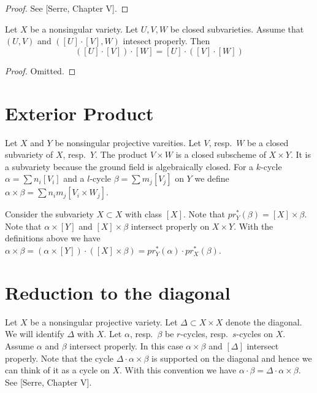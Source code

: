 \begin{proof}
See [Serre, Chapter V].
\end{proof}


\begin{lemma}
\label{lemma-associativity}
Let $X$ be a nonsingular variety.
Let $U, V, W$ be closed subvarieties. Assume that
$(U, V)$ and $([U] \cdot [V], W)$ intesect properly.
Then
$$
([U] \cdot [V]) \cdot [W] = [U] \cdot ( [V] \cdot [W] )
$$
\end{lemma}

\begin{proof}
Omitted.
\end{proof}



\section{Exterior Product}
\label{section-exterior-product}

\noindent
Let $X$ and $Y$ be nonsingular projective vareities.
Let $V$, resp.\ $W$ be a closed subvariety of $X$, resp.\ $Y$.
The product $V\times W$ is a closed subscheme of $X\times Y$.
It is a subvariety because the ground field is algebraically closed.
For a $k$-cycle $\alpha = \sum n_i [V_i]$ and a $l$-cycle
$\beta = \sum m_j [V_j]$ on $Y$ we define
$\alpha \times \beta = \sum n_i m_j [V_i \times W_j]$. 

\medskip\noindent
Consider the subvariety $X \subset X$ with class $[X]$.
Note that $pr_Y^*(\beta) = [X]\times \beta$.
Note that $\alpha \times [Y]$ and $[X]\times \beta$
intersect properly on $X\times Y$. With the definitions
above we have $\alpha \times \beta = 
(\alpha \times [Y])\cdot ([X]\times\beta) =
pr_Y^*(\alpha) \cdot pr_X^*(\beta)$.




\section{Reduction to the diagonal}
\label{section-reduction-diagonal}

\noindent
Let $X$ be a nonsingular projective
variety. Let $\Delta \subset X \times X$ denote the diagonal. 
We will identify $\Delta$ with $X$.
Let $\alpha$, resp.\ $\beta$ be $r$-cycles, resp.\ $s$-cycles
on $X$. Assume $\alpha$ and $\beta$ intersect properly. In this case
$\alpha \times \beta$ and $[\Delta]$ intersect properly. Note that
the cycle $\Delta \cdot \alpha\times\beta$ is supported on the diagonal
and hence we can think of it as a cycle on $X$. With this convention
we have $\alpha \cdot \beta = \Delta \cdot \alpha\times\beta$.
See [Serre, Chapter V]. 

